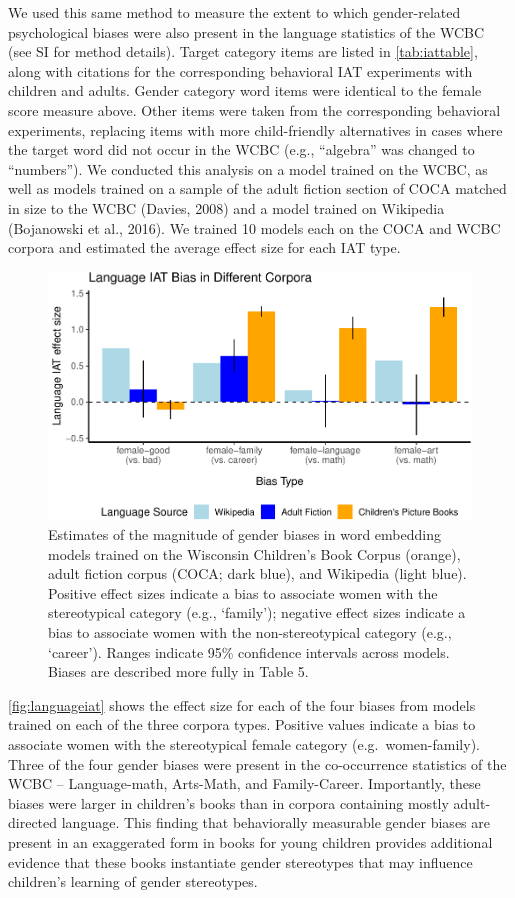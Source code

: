 \documentclass[english,,man,floatsintext]{apa6}
\begin{document}
We used this same method to measure the extent to which gender-related psychological biases were also present in the language statistics of the WCBC (see SI for method details). Target category items are listed in \autoref{tab:iattable}, along with citations for the corresponding behavioral IAT experiments with children and adults. Gender category word items were identical to the female score measure above. Other items were taken from the corresponding behavioral experiments, replacing items with more child-friendly alternatives in cases where the target word did not occur in the WCBC (e.g., \enquote{algebra} was changed to \enquote{numbers}). We conducted this analysis on a model trained on the WCBC, as well as models trained on a sample of the adult fiction section of COCA matched in size to the WCBC (Davies, 2008) and a model trained on Wikipedia (Bojanowski et al., 2016). We trained 10 models each on the COCA and WCBC corpora and estimated the average effect size for each IAT type.

\begin{figure}[t!]
\includegraphics[width=\textwidth,]{kidbookgender_files/figure-latex/languageiat-1} \caption{Estimates of the magnitude of gender biases in word embedding models trained on the Wisconsin Children’s Book Corpus (orange), adult fiction corpus (COCA; dark blue), and Wikipedia (light blue). Positive effect sizes indicate a bias to associate women with the stereotypical category (e.g., ‘family'); negative effect sizes indicate a bias to associate women with the non-stereotypical category (e.g., ‘career’).  Ranges indicate 95\% confidence intervals across models. Biases are described more fully in Table 5.}\label{fig:languageiat}
\end{figure}

\autoref{fig:languageiat} shows the effect size for each of the four biases from models trained on each of the three corpora types. Positive values indicate a bias to associate women with the stereotypical female category (e.g.~women-family). Three of the four gender biases were present in the co-occurrence statistics of the WCBC -- Language-math, Arts-Math, and Family-Career. Importantly, these biases were larger in children's books than in corpora containing mostly adult-directed language. This finding that behaviorally measurable gender biases are present in an exaggerated form in books for young children provides additional evidence that these books instantiate gender stereotypes that may influence children's learning of gender stereotypes.
\end{document}
